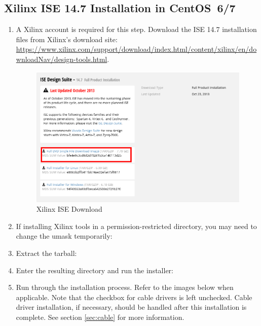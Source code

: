 \begin{flushleft}
\subsection{Xilinx ISE 14.7 Installation in CentOS~6/7}
\label{sec:ise}
\begin{flushleft}
\begin{enumerate}
\item A Xilinx account is required for this step. Download the ISE 14.7 installation files from Xilinx's download site:
\url{https://www.xilinx.com/support/download/index.html/content/xilinx/en/downloadNav/design-tools.html}.
\begin{figure}[ht]
	\centerline{\includegraphics[scale=0.4]{figures/xilinx_ise_download}}
	\caption{Xilinx ISE Download}
\end{figure}
\item If installing Xilinx tools in a permission-restricted directory, you may need to change the umask temporarily:\newline
{}\newline
{}
\item Extract the tarball:\newline
{}
\item Enter the resulting directory and run the installer:\newline
{}\newline
{}\newline
\pagebreak
\item Run through the installation process. Refer to the images below when applicable. Note that the checkbox for cable drivers is left unchecked. Cable driver installation, if necessary, should be handled after this installation is complete. See section \ref{sec:cable} for more information.

\end{enumerate}
\end{flushleft}
\end{flushleft}
